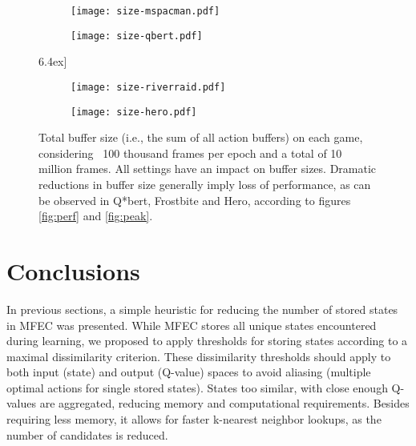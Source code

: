 \documentclass{article}
\begin{document}
\begin{figure}[htb]
    \centering
    \begin{subfigure}{.49\textwidth}
        \centering
        \texttt{[image: size-mspacman.pdf]}
        \label{fig:size-mspacman}
    \end{subfigure}
    \begin{subfigure}{.49\textwidth}
        \centering
        \texttt{[image: size-qbert.pdf]}
        \label{fig:size-qbert}
    \end{subfigure}\-6.4ex]
    \begin{subfigure}{.49\textwidth}
        \centering
        \texttt{[image: size-riverraid.pdf]}
        \label{fig:size-riverraid}
    \end{subfigure}
    \begin{subfigure}{.49\textwidth}
        \centering
        \texttt{[image: size-hero.pdf]}
        \label{fig:size-hero}
    \end{subfigure}\vspace{-1.5\baselineskip}
    
    \caption{Total buffer size (i.e., the sum of all action buffers) on each game, considering ~100 thousand frames per epoch and a total of 10 million frames. All settings have an impact on buffer sizes. Dramatic reductions in buffer size generally imply loss of performance, as can be observed in Q*bert, Frostbite and Hero, according to figures \ref{fig:perf} and \ref{fig:peak}.}
    \label{fig:size}
\end{figure}


\section{Conclusions}
\label{sec:conclusions}

In previous sections, a simple heuristic for reducing the number of stored states in MFEC was presented. While MFEC stores all unique states encountered during learning, we proposed to apply thresholds for storing states according to a maximal dissimilarity criterion. These dissimilarity thresholds should apply to both input (state) and output (Q-value) spaces to avoid aliasing (multiple optimal actions for single stored states). States too similar, with close enough Q-values are aggregated, reducing memory and computational requirements. Besides requiring less memory, it allows for faster k-nearest neighbor lookups, as the number of candidates is reduced.
\end{document}
